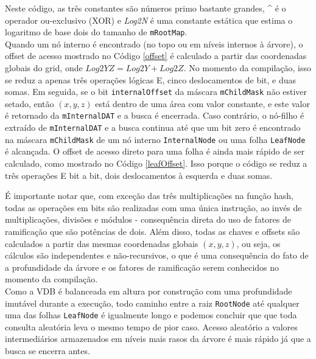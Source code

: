 \documentclass[12pt, a4paper, oneside]{book}
\begin{document}


Neste código, as três constantes são números primo bastante grandes, \^\; é o operador ou-exclusivo (XOR) e {\it Log2N} é uma constante estática que estima o logaritmo de base dois do tamanho de \texttt{mRootMap}. \\



Quando um nó interno é encontrado (no topo ou em níveis internos à árvore), o offset de acesso mostrado no Código \ref{offset} é calculado a partir das coordenadas globais do grid, onde $Log2YZ = Log2Y + Log2Z$. No momento da compilação, isso se reduz a apenas três operações lógicas E, cinco deslocamentos de bit, e duas somas. Em seguida, se o bit \texttt{internalOffset} da máscara \texttt{mChildMask} não estiver setado, então $(x, y, z)$ está dentro de uma área com valor constante, e este valor é retornado da \texttt{mInternalDAT} e a busca é encerrada. Caso contrário, o nó-filho é extraído de \texttt{mInternalDAT} e a busca continua até que um bit zero é encontrado na máscara \texttt{mChildMask} de um nó interno \texttt{InternalNode} ou uma folha \texttt{LeafNode} é alcançada. O offset de acesso direto para uma folha é ainda mais rápido de ser calculado, como mostrado no Código \ref{leafOffset}. Isso porque o código se reduz a três operações E bit a bit, dois deslocamentos à esquerda e duas somas.

É importante notar que, com exceção das três multiplicações na função hash, todas as operações em bits são realizadas com uma única instrução, ao invés de multiplicações, divisões e módulos - consequência direta do uso de fatores de ramificação que são potências de dois. Além disso, todas as chaves e offsets são calculados a partir das mesmas coordenadas globais $(x, y, z)$, ou seja, os cálculos são independentes e não-recursivos, o que é uma consequência do fato de a profundidade da árvore e os fatores de ramificação serem conhecidos no momento da compilação. \\



Como a VDB é balanceada em altura por construção com uma profundidade imutável durante a execução, todo caminho entre a raiz \texttt{RootNode} até qualquer uma das folhas \texttt{LeafNode} é igualmente longo e podemos concluir que que toda consulta aleatória leva o mesmo tempo de pior caso. Acesso aleatório a valores intermediários armazenados em níveis mais rasos da árvore é mais rápido já que a busca se encerra antes. \\
\end{document}
